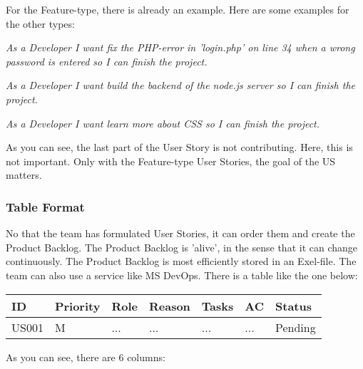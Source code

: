 \documentclass[10pt]{report}
\begin{document}
\noindent For the Feature-type, there is already an example. Here are some examples for the other types:

\emph{As a Developer I want fix the PHP-error in 'login.php' on line 34 when a wrong password is entered so I can finish the project.}

\emph{As a Developer I want build the backend of the node.js server so I can finish the project.}

\emph{As a Developer I want learn more about CSS so I can finish the project.}

\noindent As you can see, the last part of the User Story is not contributing. Here, this is not important. Only with the Feature-type User Stories, the goal of the US matters.

\subsubsection{Table Format}

No that the team has formulated User Stories, it can order them and create the Product Backlog. The Product Backlog is 'alive', in the sense that it can change continuously. The Product Backlog is most efficiently stored in an Exel-file. The team can also use a service like MS DevOps. There is a table like the one below:

\medskip
\begin{tabularx}{0.8\textwidth} { 
  | >{\raggedright\arraybackslash}X 
  | >{\centering\arraybackslash}X 
  | >{\raggedright\arraybackslash}X 
  | >{\raggedright\arraybackslash}X 
  | >{\raggedright\arraybackslash}X 
  | >{\raggedright\arraybackslash}X 
  | >{\raggedleft\arraybackslash}X | }
 \hline
 ID & Priority & Role & Reason & Tasks & AC & Status \\
 \hline
 US001 & M & ... & ...  & ... & ... & Pending \\
 \hline
\end{tabularx}
\medskip

\noindent As you can see, there are 6 columns:
\end{document}
